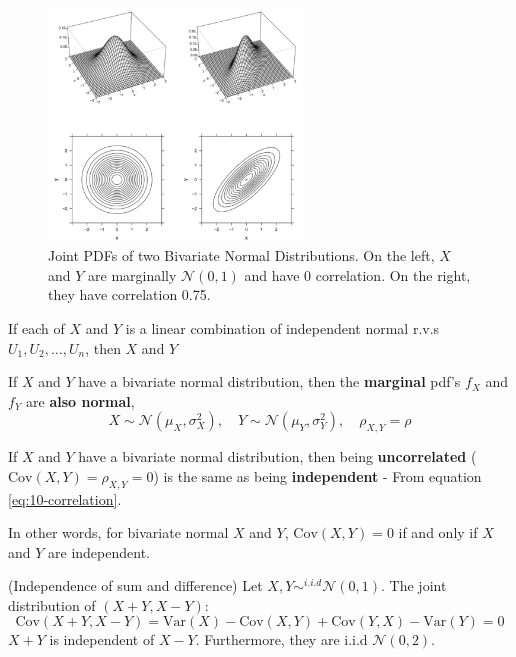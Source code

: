 \documentclass{article}
\begin{document}
\begin{figure}[H]
    \centering
    \includegraphics[width=0.6\textwidth]{Images/bivariatenormal.png}
    \caption{Joint PDFs of two Bivariate Normal Distributions. On the left, $X$ and $Y$ are marginally $\mathcal{N}(0,1)$ and have 0 correlation. On the right, they have correlation 0.75.}
    \label{fig:10-bivariatenormal}
\end{figure} 

\begin{theorem}
    If each of $X$ and $Y$ is a linear combination of independent normal r.v.s $U_{1}, U_{2}, \dots, U_n$, then $X$ and $Y$  
\end{theorem}

\begin{theorem}
    If $X$ and $Y$ have a bivariate normal distribution, then the \textbf{marginal} pdf's $f_X$ and $f_Y$ are \textbf{also normal}, \begin{equation*}
        X \sim \mathcal{N}(\mu_X, \sigma_X^{2}), \quad Y \sim \mathcal{N}(\mu_Y, \sigma^{2}_Y), \quad \rho_{X,Y} = \rho
    \end{equation*} 
\end{theorem}


\begin{theorem}
    If $X$ and $Y$ have a bivariate normal distribution, then being \textbf{uncorrelated} ($\text{Cov}(X,Y) = \rho_{X,Y} = 0$) is the same as being \textbf{independent} - From equation \ref{eq:10-correlation}. 
\end{theorem}

\noindent In other words, for bivariate normal $X$ and $Y$, $\text{Cov}(X,Y) = 0$ if and only if $X$ and $Y$ are independent. 

\begin{theorem}
    (Independence of sum and difference) Let $X, Y \sim^{i.i.d} \mathcal{N}(0,1)$. The joint distribution of $(X + Y, X - Y)$: \begin{equation*}
        \text{Cov}(X + Y, X-Y) = \text{Var}(X) - \text{Cov}(X,Y) + \text{Cov}(Y,X) - \text{Var}(Y) = 0
    \end{equation*}
    \noindent $X + Y$ is independent of $X - Y$. Furthermore, they are i.i.d $\mathcal{N}(0,2)$. 
\end{theorem}
\end{document}
